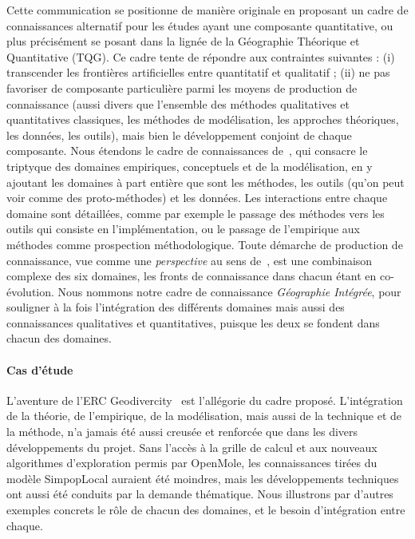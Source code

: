 \documentclass[11pt]{article}
\begin{document}
Cette communication se positionne de manière originale en proposant un cadre de connaissances alternatif pour les études ayant une composante quantitative, ou plus précisément se posant dans la lignée de la Géographie Théorique et Quantitative (TQG). Ce cadre tente de répondre aux contraintes suivantes : (i) transcender les frontières artificielles entre quantitatif et qualitatif ; (ii) ne pas favoriser de composante particulière parmi les moyens de production de connaissance (aussi divers que l'ensemble des méthodes qualitatives et quantitatives classiques, les méthodes de modélisation, les approches théoriques, les données, les outils), mais bien le développement conjoint de chaque composante. Nous étendons le cadre de connaissances de~\cite{livet2010ontology}, qui consacre le triptyque des domaines empiriques, conceptuels et de la modélisation, en y ajoutant les domaines à part entière que sont les méthodes, les outils (qu'on peut voir comme des proto-méthodes) et les données. Les interactions entre chaque domaine sont détaillées, comme par exemple le passage des méthodes vers les outils qui consiste en l'implémentation, ou le passage de l'empirique aux méthodes comme prospection méthodologique. Toute démarche de production de connaissance, vue comme une \emph{perspective} au sens de~\cite{giere2010scientific}, est une combinaison complexe des six domaines, les fronts de connaissance dans chacun étant en co-évolution. Nous nommons notre cadre de connaissance \emph{Géographie Intégrée}, pour souligner à la fois l'intégration des différents domaines mais aussi des connaissances qualitatives et quantitatives, puisque les deux se fondent dans chacun des domaines.


\paragraph{Cas d'étude}

L'aventure de l'ERC Geodivercity~\cite{pumain2017book} est l'allégorie du cadre proposé. L'intégration de la théorie, de l'empirique, de la modélisation, mais aussi de la technique et de la méthode, n'a jamais été aussi creusée et renforcée que dans les divers développements du projet. Sans l'accès à la grille de calcul et aux nouveaux algorithmes d'exploration permis par OpenMole, les connaissances tirées du modèle SimpopLocal auraient été moindres, mais les développements techniques ont aussi été conduits par la demande thématique. Nous illustrons par d'autres exemples concrets le rôle de chacun des domaines, et le besoin d'intégration entre chaque.
\end{document}

